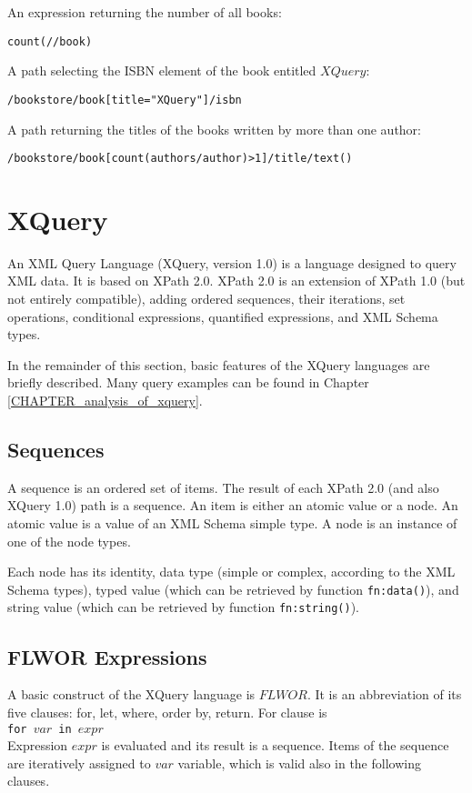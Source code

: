 An expression returning the number of all books:
\begin{alltt}
count(//book)
\end{alltt}

A path selecting the ISBN element of the book entitled $XQuery$:
\begin{alltt}
/bookstore/book[title = "XQuery"]/isbn
\end{alltt}

A path returning the titles of the books written by more than one author:
\begin{alltt}
/bookstore/book[count(authors/author) > 1]/title/text()
\end{alltt}

\section{XQuery}
An XML Query Language (XQuery, version 1.0) \cite{w3c_xquery} is a language designed to query XML data. It is based on XPath 2.0. XPath 2.0 is an extension of XPath 1.0 (but not entirely compatible), adding ordered sequences, their iterations, set operations, conditional expressions, quantified expressions, and XML Schema types.

In the remainder of this section, basic features of the XQuery languages are briefly described. Many query examples can be found in Chapter \ref{CHAPTER_analysis_of_xquery}.

\subsection{Sequences}
A sequence is an ordered set of items. The result of each XPath 2.0 (and also XQuery 1.0) path is a sequence. An item is either an atomic value or a node. An atomic value is a value of an XML Schema simple type. A node is an instance of one of the node types.

Each node has its identity, data type (simple or complex, according to the XML Schema types), typed value (which can be retrieved by function \texttt{fn:data()}), and string value (which can be retrieved by function \texttt{fn:string()}).

\subsection{FLWOR Expressions}
A basic construct of the XQuery language is $FLWOR$. It is an abbreviation of its five clauses: for, let, where, order by, return. For clause is \\
\texttt{for $var$ in $expr$} \\
Expression $expr$ is evaluated and its result is a sequence. Items of the sequence are iteratively assigned to $var$ variable, which is valid also in the following clauses.

